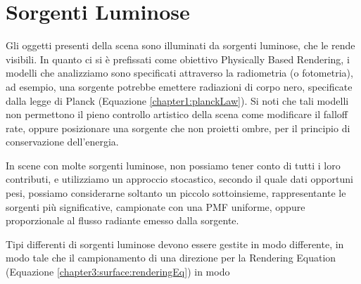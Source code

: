 \section{Sorgenti Luminose}
Gli oggetti presenti della scena sono illuminati da sorgenti luminose, che le rende visibili. In quanto ci si \`e prefissati come obiettivo 
Physically Based Rendering, i modelli che analizziamo sono specificati attraverso la radiometria (o fotometria), ad esempio, una sorgente potrebbe 
emettere radiazioni di corpo nero, specificate dalla legge di Planck (Equazione \ref{chapter1:planckLaw}). Si noti che tali modelli non permettono il
pieno controllo artistico della scena come modificare il falloff rate, oppure posizionare una sorgente che non proietti ombre, per il principio di 
conservazione dell'energia.\par
In scene con molte sorgenti luminose, non possiamo tener conto di tutti i loro contributi, e utilizziamo un approccio stocastico, secondo il quale
dati opportuni pesi, possiamo considerarne soltanto un piccolo sottoinsieme, rappresentante le sorgenti pi\`u significative, campionate con una 
PMF uniforme, oppure proporzionale al flusso radiante emesso dalla sorgente\footnotemark{}.\par
Tipi differenti di sorgenti luminose devono essere gestite in modo differente, in modo tale che il campionamento di una direzione per la 
Rendering Equation (Equazione \ref{chapter3:surface:renderingEq}) in modo 
